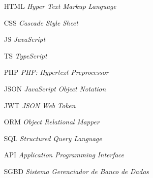 \documentclass[
	12pt,			%
	openany,		%
	oneside,		%
	a4paper,		%
	english,		%
	brazil			%
	]{abntex2}
\begin{document}
\listoffigures*
\cleardoublepage

\listoftables*
\cleardoublepage

\cleardoublepage


\begin{siglas}
    \item[HTML] \textit{Hyper Text Markup Language}
    \item[CSS]  \textit{Cascade Style Sheet}
    \item[JS]   \textit{JavaScript}
    \item[TS]   \textit{TypeScript}
    \item[PHP]  \textit{PHP: Hypertext Preprocessor}
    \item[JSON] \textit{JavaScript Object Notation}
    \item[JWT]  \textit{JSON Web Token}
    \item[ORM]  \textit{Object Relational Mapper}
    \item[SQL]  \textit{Structured Query Language}
    \item[API] \textit{Application Programming Interface}
    \item[SGBD] \textit{Sistema Gerenciador de Banco de Dados}
\end{siglas}

\tableofcontents*
\cleardoublepage

\textual









\postextual
\end{document}
